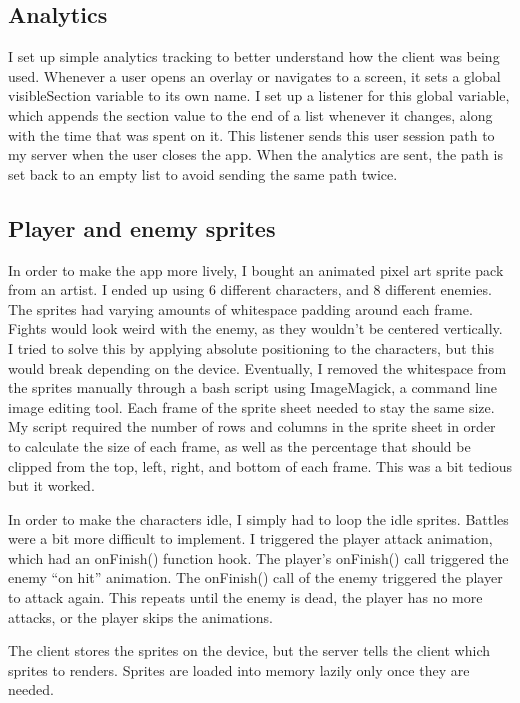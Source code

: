 \documentclass{l4proj}
\begin{document}
\subsection{Analytics}
I set up simple analytics tracking to better understand how the client was being used. Whenever a user opens an overlay or navigates to a screen, it sets a global visibleSection variable to its own name. I set up a listener for this global variable, which appends the section value to the end of a list whenever it changes, along with the time that was spent on it. This listener sends this user session path to my server when the user closes the app. When the analytics are sent, the path is set back to an empty list to avoid sending the same path twice.

\subsection{Player and enemy sprites}
In order to make the app more lively, I bought an animated pixel art sprite pack from an artist. I ended up using 6 different characters, and 8 different enemies. The sprites had varying amounts of whitespace padding around each frame. Fights would look weird with the enemy, as they wouldn't be centered vertically. I tried to solve this by applying absolute positioning to the characters, but this would break depending on the device. Eventually, I removed the whitespace from the sprites manually through a bash script using ImageMagick, a command line image editing tool. Each frame of the sprite sheet needed to stay the same size. My script required the number of rows and columns in the sprite sheet in order to calculate the size of each frame, as well as the percentage that should be clipped from the top, left, right, and bottom of each frame. This was a bit tedious but it worked.

In order to make the characters idle, I simply had to loop the idle sprites. Battles were a bit more difficult to implement. I triggered the player attack animation, which had an onFinish() function hook. The player's onFinish() call triggered the enemy ``on hit'' animation. The onFinish() call of the enemy triggered the player to attack again. This repeats until the enemy is dead, the player has no more attacks, or the player skips the animations.

The client stores the sprites on the device, but the server tells the client which sprites to renders. Sprites are loaded into memory lazily only once they are needed.
\end{document}
